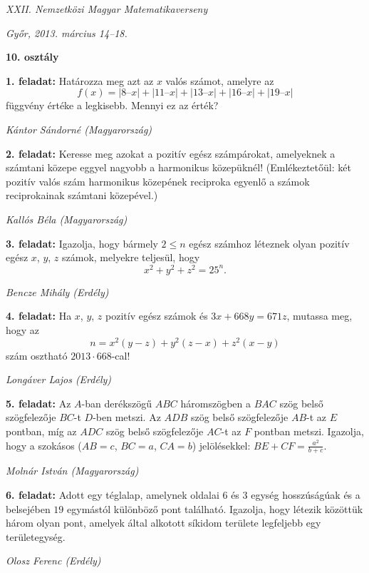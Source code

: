 \documentclass[a4paper,10pt]{article}
\def\ki#1#2{\hfill {\it #1 (#2)}\medskip}
\begin{document}
\begin{center} \Large {\em XXII. Nemzetközi Magyar Matematikaverseny} \end{center}
\begin{center} \large{\em Győr, 2013. március 14--18.} \end{center}
\smallskip
\begin{center} \large{\bf 10. osztály} \end{center}
\bigskip 

{\bf 1. feladat: }
Határozza meg azt az $x$ valós számot, amelyre az
$$f(x) = |8 – x| + | 11 – x | + | 13 – x | + | 16 – x | + | 19 – x |$$
függvény értéke a legkisebb. Mennyi ez az érték?

\ki{Kántor Sándorné}{Magyarország}\medskip

{\bf 2. feladat: }
Keresse meg azokat a pozitív egész számpárokat, amelyeknek a számtani közepe eggyel nagyobb a harmonikus közepüknél!
(Emlékeztetőül: két pozitív valós szám harmonikus közepének reciproka egyenlő a számok reciprokainak számtani közepével.)

\ki{Kallós Béla}{Magyarország}\medskip

{\bf 3. feladat: }
Igazolja, hogy bármely $2 \le n$ egész számhoz léteznek olyan pozitív egész $x$, $y$, $z$ számok, melyekre teljesül, hogy
$$x^2+y^2+z^2=25^n.$$

\ki{Bencze Mihály}{Erdély}\medskip

{\bf 4. feladat: }
Ha $x$, $y$, $z$ pozitív egész számok és $3x+668y=671z$, mutassa meg, hogy az $$n=x^2(y-z)+y^2(z-x)+z^2(x-y)$$ szám osztható $2013\cdot 668$-cal!

\ki{Longáver Lajos}{Erdély}\medskip

{\bf 5. feladat: }
Az $A$-ban derékszögű $ABC$ háromszögben a $BAC$ szög belső szögfelezője $BC$-t $D$-ben metszi. Az $ADB$ szög belső szögfelezője $AB$-t az $E$ pontban, míg az $ADC$ szög belső szögfelezője $AC$-t az $F$ pontban metszi.
Igazolja, hogy a szokásos ($AB = c$, $BC = a$, $CA= b$) jelölésekkel: $BE+CF=\frac{a^2}{b+c}$.

\ki{Molnár István}{Magyarország}\medskip

{\bf 6. feladat: }
Adott egy téglalap, amelynek oldalai $6$ és $3$ egység hosszúságúak és a belsejében $19$ egymástól különböző pont található. Igazolja, hogy létezik közöttük három olyan pont, amelyek által alkotott síkidom területe legfeljebb egy területegység.

\ki{Olosz Ferenc}{Erdély}\medskip

\vfill
\end{document}
